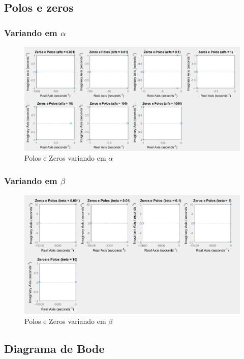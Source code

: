 \documentclass[a4paper, 12pt]{article}
\begin{document}
		\subsection{Polos e zeros}	
			\subsubsection{Variando em $\alpha$}
			\begin{figure}[!ht]
				\centering
				\includegraphics[scale=0.5]{img/3b_alfa.png}
				\caption{Polos e Zeros variando em $\alpha$}	
			\end{figure}				
			\subsubsection{Variando em $\beta$}		
			\begin{figure}[!ht]
				\centering
				\includegraphics[scale=0.55]{img/3b_beta.png}
				\caption{Polos e Zeros variando em $\beta$}	
			\end{figure}					
		\subsection{Diagrama de Bode}		
\end{document}
